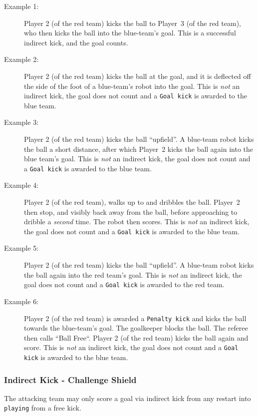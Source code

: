 \begin{description}
  \item[Example 1:] Player 2 (of the red team) kicks the ball to Player~3 (of the red team), who then kicks the ball into the blue-team's goal.
  This is a successful indirect kick, and the goal counts.
  \item[Example 2:] Player 2 (of the red team) kicks the ball at the goal, and it is deflected off the side of the foot of a blue-team's robot into the goal.
    This is \textit{not} an indirect kick, the goal does not count and a \texttt{Goal kick} is awarded to the blue team.
  \item[Example 3:] Player 2 (of the red team) kicks the ball ``upfield''.
    A blue-team robot kicks the ball a short distance, after which Player~2 kicks the ball again into the blue team's goal.
    This is \textit{not} an indirect kick, the goal does not count and a \texttt{Goal kick} is awarded to the blue team.
  \item[Example 4:] Player 2 (of the red team), walks up to and dribbles the ball.
    Player~2 then stop, and visibly back away from the ball, before approaching to dribble a \textit{second} time. The robot then scores.
    This is \textit{not} an indirect kick, the goal does not count and a \texttt{Goal kick} is awarded to the blue team.
  \item[Example 5:] Player 2 (of the red team) kicks the ball ``upfield''.
  A blue-team robot kicks the ball again into the red team's goal.
  This is \textit{not} an indirect kick, the goal does not count and a \texttt{Goal kick} is awarded to the red team.
  \item[Example 6:] Player 2 (of the red team) is awarded a \texttt{Penalty kick} and kicks the ball towards the blue-team's goal. The goalkeeper blocks the ball. The referee then calls ``Ball Free``.
  Player 2 (of the red team) kicks the ball again and score.
  This is \textit{not} an indirect kick, the goal does not count and a \texttt{Goal kick} is awarded to the blue team.
\end{description}

\subsubsection{Indirect Kick - Challenge Shield}
\label{sec:indirect_kick_challenger}

The attacking team may only score a goal via indirect kick from any restart into \texttt{playing} from a free kick.

